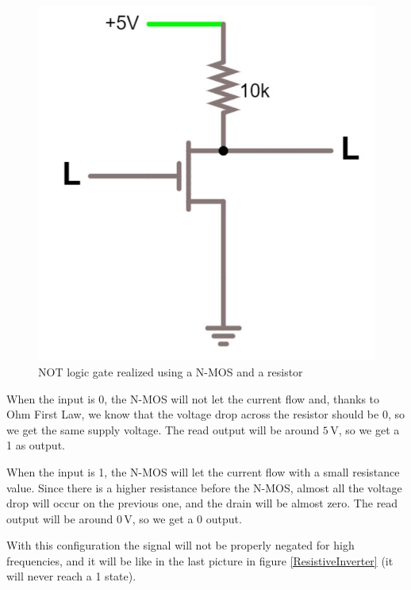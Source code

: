 \documentclass{article}
\begin{document}
\begin{figure}[h]
    \centering
    \includegraphics[scale=0.3]{IM_NOT_NMOS.JPG}
    \caption{NOT logic gate realized using a N-MOS and a resistor}
    \label{NOT_N-MOS}
\end{figure}

When the input is 0, the N-MOS will not let the current flow and, thanks to Ohm First Law, we know that the voltage drop across the resistor should be 0, so we get the same supply voltage. The read output will be around $5\,\textrm{V}$, so we get a 1 as output.

\vspace{3mm}

When the input is 1, the N-MOS will let the current flow with a small resistance value. Since there is a higher resistance before the N-MOS, almost all the voltage drop will occur on the previous one, and the drain will be almost zero. The read output will be around $0\,\textrm{V}$, so we get a 0 output.

\vspace{3mm}

With this configuration the signal will not be properly negated for high frequencies, and it will be like in the last picture in figure \ref{ResistiveInverter} (it will never reach a 1 state).
\end{document}
